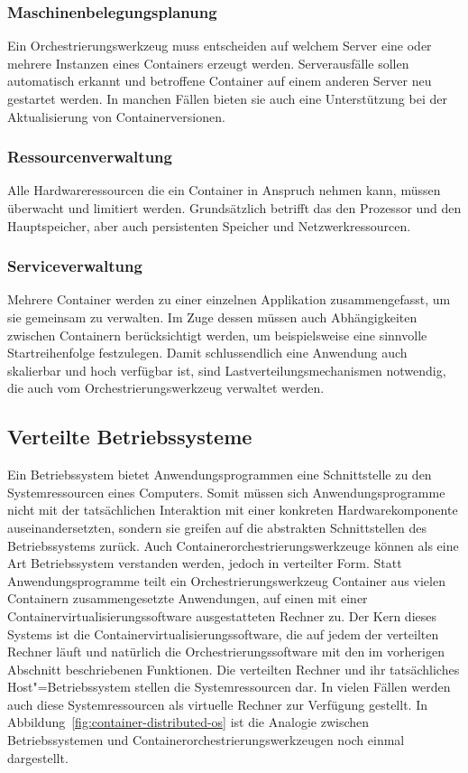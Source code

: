 \subsubsection{Maschinenbelegungsplanung}

Ein Orchestrierungswerkzeug muss entscheiden auf welchem Server eine oder mehrere Instanzen eines Containers erzeugt werden. Serverausfälle sollen automatisch erkannt und betroffene Container auf einem anderen Server neu gestartet werden. In manchen Fällen bieten sie auch eine Unterstützung bei der Aktualisierung von Containerversionen.

\subsubsection{Ressourcenverwaltung}

Alle Hardwareressourcen die ein Container in Anspruch nehmen kann, müssen überwacht und limitiert werden. Grundsätzlich betrifft das den Prozessor und den Hauptspeicher, aber auch persistenten Speicher und Netzwerkressourcen.

\subsubsection{Serviceverwaltung}

Mehrere Container werden zu einer einzelnen Applikation zusammengefasst, um sie gemeinsam zu verwalten. Im Zuge dessen müssen auch Abhängigkeiten zwischen Containern berücksichtigt werden, um beispielsweise eine sinnvolle Startreihenfolge festzulegen. Damit schlussendlich eine Anwendung auch skalierbar und hoch verfügbar ist, sind Lastverteilungsmechanismen notwendig, die auch vom Orchestrierungswerkzeug verwaltet werden.

\subsection{Verteilte Betriebssysteme}

Ein Betriebssystem bietet Anwendungsprogrammen eine Schnittstelle zu den Systemressourcen eines Computers. Somit müssen sich Anwendungsprogramme nicht mit der tatsächlichen Interaktion mit einer konkreten Hardwarekomponente auseinandersetzten, sondern sie greifen auf die abstrakten Schnittstellen des Betriebssystems zurück. Auch Containerorchestrierungswerkzeuge können als eine Art Betriebssystem verstanden werden, jedoch in verteilter Form. Statt Anwendungsprogramme teilt ein Orchestrierungswerkzeug Container \bzw aus vielen Containern zusammengesetzte Anwendungen, auf einen mit einer Containervirtualisierungssoftware ausgestatteten Rechner zu. Der Kern dieses Systems ist die Containervirtualisierungssoftware, die auf jedem der verteilten Rechner läuft und natürlich die Orchestrierungssoftware mit den im vorherigen Abschnitt beschriebenen Funktionen. Die verteilten Rechner und ihr tatsächliches Host"=Betriebssystem stellen die Systemressourcen dar. In vielen Fällen werden auch diese Systemressourcen als virtuelle Rechner zur Verfügung gestellt. In Abbildung~\ref{fig:container-distributed-os} ist die Analogie zwischen Betriebssystemen und Containerorchestrierungswerkzeugen noch einmal dargestellt.

